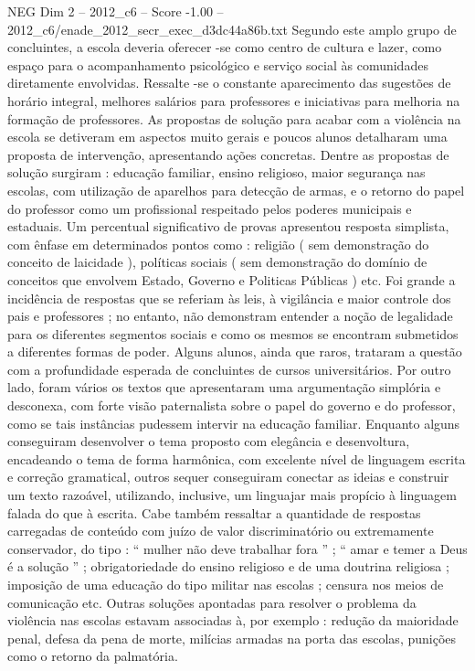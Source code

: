 \begin{textsample}{NEG Dim 2 – 2012\_c6 – Score -1.00 – 2012\_c6/enade\_2012\_secr\_exec\_d3dc44a86b.txt}
Segundo este amplo grupo de concluintes, a escola deveria oferecer -se como centro de cultura e lazer, como espaço para o acompanhamento psicológico e serviço social às comunidades diretamente envolvidas.
Ressalte -se o constante aparecimento das sugestões de horário integral, melhores salários para professores e iniciativas para melhoria na formação de professores.
As propostas de solução para acabar com a violência na escola se detiveram em aspectos muito gerais e poucos alunos detalharam uma proposta de intervenção, apresentando ações concretas.
Dentre as propostas de solução surgiram : educação familiar, ensino religioso, maior segurança nas escolas, com utilização de aparelhos para detecção de armas, e o retorno do papel do professor como um profissional respeitado pelos poderes municipais e estaduais.
Um percentual significativo de provas apresentou resposta simplista, com ênfase em determinados pontos como : religião ( sem demonstração do conceito de laicidade ), políticas sociais ( sem demonstração do domínio de conceitos que envolvem Estado, Governo e Politicas Públicas ) etc.
Foi grande a incidência de respostas que se referiam às leis, à vigilância e maior controle dos pais e professores ; no entanto, não demonstram entender a noção de legalidade para os diferentes segmentos sociais e como os mesmos se encontram submetidos a diferentes formas de poder.
Alguns alunos, ainda que raros, trataram a questão com a profundidade esperada de concluintes de cursos universitários.
Por outro lado, foram vários os textos que apresentaram uma argumentação simplória e desconexa, com forte visão paternalista sobre o papel do governo e do professor, como se tais instâncias pudessem intervir na educação familiar.
Enquanto alguns conseguiram desenvolver o tema proposto com elegância e desenvoltura, encadeando o tema de forma harmônica, com excelente nível de linguagem escrita e correção gramatical, outros sequer conseguiram conectar as ideias e construir um texto razoável, utilizando, inclusive, um linguajar mais propício à linguagem falada do que à escrita.
Cabe também ressaltar a quantidade de respostas carregadas de conteúdo com juízo de valor discriminatório ou extremamente conservador, do tipo : “ mulher não deve trabalhar fora ” ; “ amar e temer a Deus é a solução ” ; obrigatoriedade do ensino religioso e de uma doutrina religiosa ; imposição de uma educação do tipo militar nas escolas ; censura nos meios de comunicação etc.
Outras soluções apontadas para resolver o problema da violência nas escolas estavam associadas à, por exemplo : redução da maioridade penal, defesa da pena de morte, milícias armadas na porta das escolas, punições como o retorno da palmatória.

\end{textsample}
